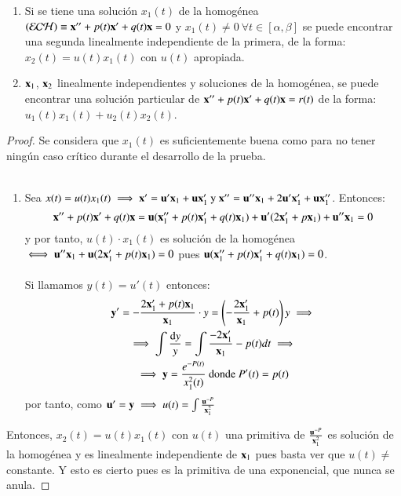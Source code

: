 \begin{enumerate}
    \item Si se tiene una solución $x_1(t)$ de la homogénea  $(\mathcal{ECH}) \equiv \mathbf{x}'' + p(t)\mathbf{x}' + q(t)\mathbf{x} = 0$ y $x_1(t) \neq 0\ \forall t \in [\alpha, \beta]$ se puede encontrar una segunda linealmente independiente de la primera, de la forma: $x_2(t) = u(t) x_1(t)$ con $u(t)$ apropiada.

    \item $\mathbf{x}_1$, $\mathbf{x}_2$ linealmente independientes y soluciones de la homogénea, se puede encontrar una solución particular de $\mathbf{x}'' + p(t)\mathbf{x}' + q(t)\mathbf{x} = r(t)$ de la forma:
    $u_1(t) x_1(t) + u_2(t)x_2(t)$.
\end{enumerate}

\begin{proof}
    Se considera que $x_1(t)$ es suficientemente buena como para no tener ningún caso crítico durante el desarrollo de la prueba.\\\\
    \begin{enumerate}
        \item Sea $x(t) = u(t)x_1(t) \implies \mathbf{x}' = \mathbf{u}'\mathbf{x}_1 + \mathbf{u}\mathbf{x}_1' \text{ y } \mathbf{x}'' = \mathbf{u}''\mathbf{x}_1 + 2\mathbf{u}'\mathbf{x}_1' + \mathbf{u}\mathbf{x}_1''$. Entonces:
        $$
            \mathbf{x}'' + p(t)\mathbf{x}' + q(t)\mathbf{x} = \mathbf{u}(\mathbf{x}_1'' +p(t)\mathbf{x}_1' + q(t)\mathbf{x}_1) + \mathbf{u}'(2\mathbf{x}_1' + p\mathbf{x}_1) + \mathbf{u}''\mathbf{x}_1= 0
        $$ y por tanto, $u(t) \cdot x_1(t)$ es solución de la homogénea $\iff \mathbf{u}''\mathbf{x}_1 + \mathbf{u}(2\mathbf{x}_1' + p(t)\mathbf{x}_1) = 0$ pues $ \mathbf{u}(\mathbf{x}_1'' +p(t)\mathbf{x}_1' + q(t)\mathbf{x}_1) = 0$.\\\\
        Si llamamos $y(t) = u'(t)$ entonces:
        \begin{gather*}
            \mathbf{y}' = -\frac{2\mathbf{x}_1' + p(t)\mathbf{x}_1}{\mathbf{x}_1}\cdot y = \left(-\frac{2\mathbf{x}_1'}{\mathbf{x}_1} + p(t) \right) y \implies \\
            \implies \int \frac{\mathrm{d} y}{y} = \int \frac{-2\mathbf{x}_1'}{\mathbf{x}_1} - p(t) dt \implies \\
            \implies \mathbf{y} = \frac{e^{-P(t)}}{x_1^2(t)} \text{ donde } P'(t) = p(t)
        \end{gather*}
        por tanto, como $\mathbf{u}' = \mathbf{y} \implies u(t) = \int \frac{\mathbf{u}^{-P}}{\mathbf{x}_1^2} $
    \end{enumerate}
    Entonces, $x_2(t) = u(t)x_1(t)$ con $u(t)$ una primitiva de $\frac{\mathbf{u}^{-P}}{\mathbf{x}_1^2} $ es solución de la homogénea y es linealmente independiente de $\mathbf{x}_1$ pues basta ver que $u(t) \neq $ constante. Y esto es cierto pues es la primitiva de una exponencial, que nunca se anula.
    \item
\end{proof}
